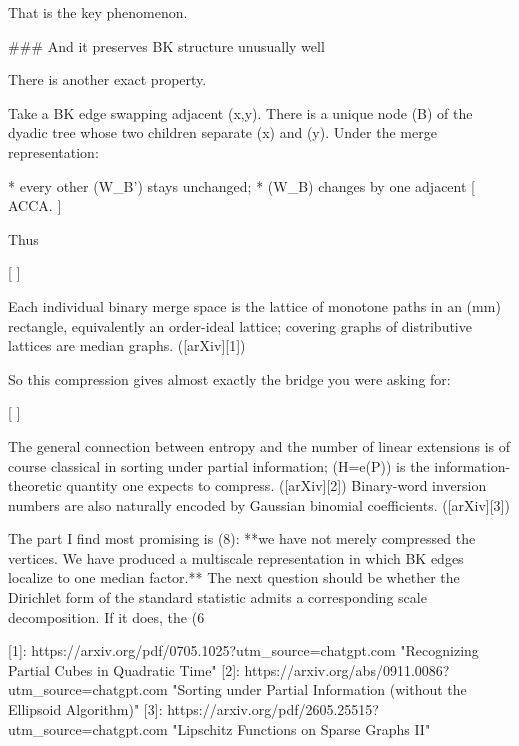 That is the key phenomenon.

### And it preserves BK structure unusually well

There is another exact property.

Take a BK edge swapping adjacent (x,y). There is a unique node (B) of the dyadic tree whose two children separate (x) and (y). Under the merge representation:

* every other (W_{B'}) stays unchanged;
* (W_B) changes by one adjacent
  [
  AC\leftrightarrow CA.
  ]

Thus

[
]

Each individual binary merge space is the lattice of monotone paths in an (m\times m) rectangle, equivalently an order-ideal lattice; covering graphs of distributive lattices are median graphs. ([arXiv][1])

So this compression gives almost exactly the bridge you were asking for:

[
]

The general connection between entropy and the number of linear extensions is of course classical in sorting under partial information; (H=\log e(P)) is the information-theoretic quantity one expects to compress. ([arXiv][2]) Binary-word inversion numbers are also naturally encoded by Gaussian binomial coefficients. ([arXiv][3])

The part I find most promising is (8): **we have not merely compressed the vertices. We have produced a multiscale representation in which BK edges localize to one median factor.** The next question should be whether the Dirichlet form of the standard statistic admits a corresponding scale decomposition. If it does, the (6%

[1]: https://arxiv.org/pdf/0705.1025?utm_source=chatgpt.com "Recognizing Partial Cubes in Quadratic Time"
[2]: https://arxiv.org/abs/0911.0086?utm_source=chatgpt.com "Sorting under Partial Information (without the Ellipsoid Algorithm)"
[3]: https://arxiv.org/pdf/2605.25515?utm_source=chatgpt.com "Lipschitz Functions on Sparse Graphs II"
